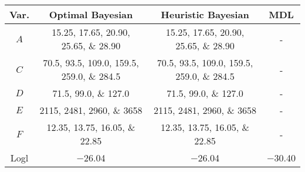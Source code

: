 \scriptsize
\begin{tabular}{@{}cccc@{}}
    \toprule
    Var. & Optimal Bayesian & Heuristic Bayesian & MDL \\
    \midrule
    $A$ & \numlist[list-final-separator = {, }]{15.25; 17.65; 20.90; 25.65; 28.90} & \numlist[list-final-separator = {, }]{15.25; 17.65; 20.90; 25.65; 28.90} & - \\
    $C$ & \numlist[list-final-separator = {, }]{70.5; 93.5; 109.0; 159.5; 259.0; 284.5} & \numlist[list-final-separator = {, }]{70.5;93.5;109.0;159.5;259.0;284.5} & - \\
    $D$ & \numlist[list-final-separator = {, }]{71.5;99.0;127.0} & \numlist[list-final-separator = {, }]{71.5;99.0; 127.0} & - \\
    $E$ & \numlist[list-final-separator = {, }]{2115;2481;2960;3658} & \numlist[list-final-separator = {, }]{2115;2481;2960;3658} & - \\
    $F$ & \numlist[list-final-separator = {, }]{12.35;13.75;16.05;22.85} & \numlist[list-final-separator = {, }]{12.35;13.75;16.05;22.85} & - \\
    \addlinespace[0.5em]
    Logl & \num{-26.04} & \num{-26.04} & \num{-30.40} \\
    \bottomrule
\end{tabular}